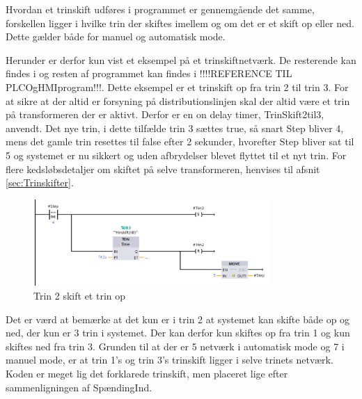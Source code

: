 Hvordan et trinskift udføres i programmet er gennemgående det samme, forskellen ligger i hvilke trin der skiftes imellem og om det er et skift op eller ned. Dette gælder både for manuel og automatisk mode.

Herunder er derfor kun vist et eksempel på et trinskiftnetværk. De resterende kan findes i og resten af programmet kan findes i !!!!REFERENCE TIL PLCOgHMIprogram!!!. Dette eksempel er et trinskift op fra trin 2 til trin 3. For at sikre at der altid er forsyning på distributionslinjen skal der altid være et trin på transformeren der er aktivt. Derfor er en on delay timer, TrinSkift2til3, anvendt. Det nye trin, i dette tilfælde trin 3 sættes true, så snart Step bliver 4, mens det gamle trin resettes til false efter 2 sekunder, hvorefter Step bliver sat til 5 og systemet er nu sikkert og uden afbrydelser blevet flyttet til et nyt trin. For flere kedsløbsdetaljer om skiftet på selve transformeren, henvises til afsnit \ref{sec:Trinskifter}.

\begin{figure}[H] %
	\centering
	\includegraphics[width=0.8\textwidth]{Figure/Trin2SkiftOp}
	\caption{Trin 2 skift et trin op}
	\label{fig:Trin2SkiftOp}
\end{figure}

Det er værd at bemærke at det kun er i trin 2 at systemet kan skifte både op og ned, der kun er 3 trin i systemet. Der kan derfor kun skiftes op fra trin 1 og kun skiftes ned fra trin 3. Grunden til at der er 5 netværk i automatisk mode og 7 i manuel mode, er at trin 1's og trin 3's trinskift ligger i selve trinets netværk. Koden er meget lig det forklarede trinskift, men placeret lige efter sammenligningen af SpændingInd.